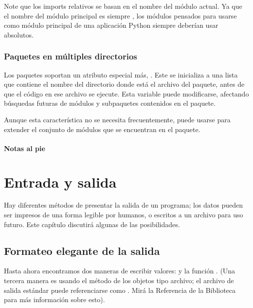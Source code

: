 \documentclass[a5paper,10pt,spanish]{sphinxmanual}
\begin{document}
\sphinxAtStartPar
Note que los imports relativos se basan en el nombre del módulo actual.  Ya que el nombre del módulo principal es siempre , los módulos pensados para usarse como módulo principal de una aplicación Python siempre deberían usar  absolutos.


\subsection{Paquetes en múltiples directorios}
\label{\detokenize{tutorial/modules:packages-in-multiple-directories}}
\sphinxAtStartPar
Los paquetes soportan un atributo especial más, .  Este se inicializa a una lista que contiene el nombre del directorio donde está el archivo  del paquete, antes de que el código en ese archivo se ejecute.  Esta variable puede modificarse, afectando búsquedas futuras de módulos y subpaquetes contenidos en el paquete.

\sphinxAtStartPar
Aunque esta característica no se necesita frecuentemente, puede usarse para extender el conjunto de módulos que se encuentran en el paquete.
\subsubsection*{Notas al pie}


\chapter{Entrada y salida}
\label{\detokenize{tutorial/inputoutput:input-and-output}}\label{\detokenize{tutorial/inputoutput:tut-io}}\label{\detokenize{tutorial/inputoutput::doc}}
\sphinxAtStartPar
Hay diferentes métodos de presentar la salida de un programa; los datos pueden ser impresos de una forma legible por humanos, o escritos a un archivo para uso futuro. Este capítulo discutirá algunas de las posibilidades.


\section{Formateo elegante de la salida}
\label{\detokenize{tutorial/inputoutput:fancier-output-formatting}}\label{\detokenize{tutorial/inputoutput:tut-formatting}}
\sphinxAtStartPar
Hasta ahora encontramos dos maneras de escribir valores:  y la función .  (Una tercera manera es usando el método  de los objetos tipo archivo; el archivo de salida estándar puede referenciarse como .  Mirá la Referencia de la Biblioteca para más información sobre esto).
\end{document}

